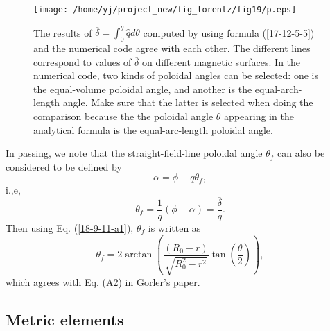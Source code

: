 \documentclass{llncs}
\begin{document}
\begin{figure}[h]
  \texttt{[image: /home/yj/project\_new/fig\_lorentz/fig19/p.eps]}
  \caption{\label{17-12-5-8}The results of $\overline{\delta} =
  \int_0^{\theta} \hat{q} d \theta$ computed by using formula
  (\ref{17-12-5-5}) and the numerical code agree with each other. The
  different lines correspond to values of $\overline{\delta}$ on different
  magnetic surfaces. In the numerical code, two kinds of poloidal angles can
  be selected: one is the equal-volume poloidal angle, and another is the
  equal-arch-length angle. Make sure that the latter is selected when doing
  the comparison because the the poloidal angle $\theta$ appearing in the
  analytical formula is the equal-arc-length poloidal angle.}
\end{figure}

In passing, we note that the straight-field-line poloidal angle $\theta_f$ can
also be considered to be defined by
\begin{equation}
  \alpha = \phi - q \theta_f,
\end{equation}
i.,e,
\begin{equation}
  \theta_f = \frac{1}{q} (\phi - \alpha) = \frac{\overline{\delta}}{q} .
\end{equation}
Then using Eq. (\ref{18-9-11-a1}), $\theta_f$ is written as
\begin{equation}
  \theta_f = 2 \arctan \left( \frac{(R_0 - r)}{\sqrt{R_0^2 - r^2}} \tan \left(
  \frac{\theta}{2} \right) \right),
\end{equation}
which agrees with Eq. (A2) in Gorler's paper{\cite{gorler2016}}.

\subsection{Metric elements}
\end{document}
